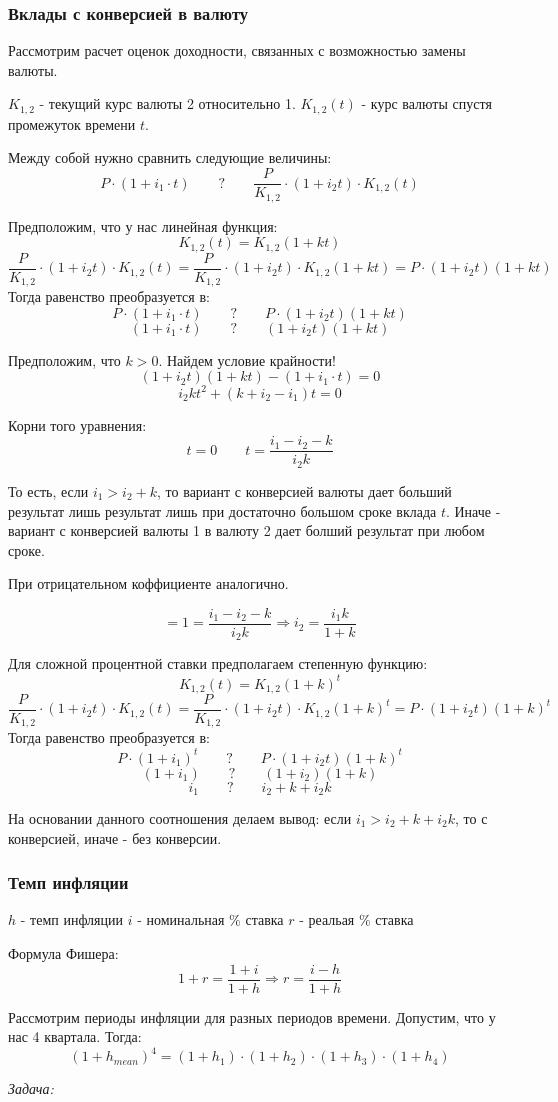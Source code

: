 \documentclass[aps,%
12pt,%
final,%
oneside,
onecolumn,%
musixtex, %
superscriptaddress,%
centertags]{article} %
\begin{document}
\subsubsection{Вклады с конверсией в валюту}

Рассмотрим расчет оценок доходности, связанных с возможностью замены валюты.

$K_{1,2}$ - текущий курс валюты 2 относительно 1. $K_{1,2}(t)$ - курс валюты спустя промежуток времени $t$. 

Между собой нужно сравнить следующие величины:
$$P \cdot (1+i_1 \cdot t) \qquad ? \qquad \frac{P}{K_{1,2}} \cdot (1 + i_2 t) \cdot K_{1,2}(t) $$

Предположим, что у нас линейная функция:
$$K_{1,2}(t) = K_{1,2} (1 + kt)$$
$$\frac{P}{K_{1,2}} \cdot (1 + i_2 t) \cdot K_{1,2}(t) = \frac{P}{K_{1,2}} \cdot (1 + i_2 t) \cdot K_{1,2} (1 + kt) = P \cdot (1 + i_2 t) (1 + kt)$$
Тогда равенство преобразуется в:
$$P \cdot (1+i_1 \cdot t) \qquad ? \qquad P \cdot (1 + i_2 t) (1 + kt)$$
$$(1+i_1 \cdot t) \qquad ? \qquad  (1 + i_2 t) (1 + kt)$$

Предположим, что $k>0$. Найдем условие крайности!
$$(1 + i_2 t) (1 + kt) - (1+i_1 \cdot t) = 0$$
$$i_2kt^2 + (k+i_2-i_1)t = 0$$

Корни того уравнения:
$$t=0 \qquad t=\frac{i_1-i_2-k}{i_2k}$$

То есть, если $i_1 >i_2+k$, то вариант с конверсией валюты дает больший результат лишь результат лишь при достаточно большом сроке вклада $t$. Иначе - вариант с конверсией валюты 1 в валюту 2 дает болший результат при любом сроке.

При отрицательном коффициенте аналогично.

$$ = 1 = \frac{i_1-i_2-k}{i_2k} \Rightarrow i_2 = \frac{i_1k}{1+k}$$

Для сложной процентной ставки предполагаем степенную функцию:
$$K_{1,2}(t) = K_{1,2} (1 + k)^t$$
$$\frac{P}{K_{1,2}} \cdot (1 + i_2 t) \cdot K_{1,2}(t) = \frac{P}{K_{1,2}} \cdot (1 + i_2 t) \cdot K_{1,2} (1 + k)^t = P \cdot (1 + i_2 t) (1 + k)^t$$
Тогда равенство преобразуется в:
$$P \cdot (1+i_1)^t \qquad ? \qquad P \cdot (1 + i_2 t) (1 + k)^t$$
$$(1+i_1) \qquad ? \qquad  (1 + i_2) (1 + k)$$
$$ i_1 \qquad ? \qquad i_2 + k + i_2 k$$

На основании данного соотношения делаем вывод: если $i_1 > i_2 + k + i_2k$, то с конверсией, иначе - без конверсии.

\subsubsection{Темп инфляции}

$h$ - темп инфляции
$i$ - номинальная $\%$ ставка
$r$ - реальая $\%$ ставка

Формула Фишера:
$$ 1 + r = \frac{1+i}{1+h} \Rightarrow r = \frac{i-h}{1+h}$$

Рассмотрим периоды инфляции для разных периодов времени. Допустим, что у нас 4 квартала. Тогда:
$$ (1+h_{mean})^4 = (1+h_1) \cdot (1+h_2) \cdot (1+h_3) \cdot (1+h_4) $$

\textit{Задача:}
\end{document}

